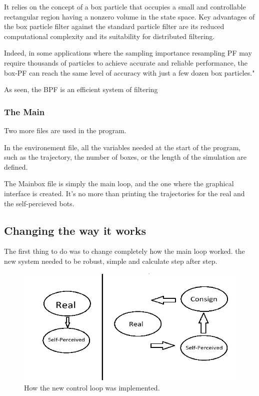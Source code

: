 It relies on the concept of a box particle that occupies a small and controllable rectangular region having a nonzero volume in the state space.
Key advantages of the box particle filter against the standard particle filter are its reduced computational complexity and its suitability for distributed filtering.

Indeed, in some applications where the sampling importance resampling PF may require thousands of particles to achieve accurate and reliable performance, the box-PF can reach the same level of accuracy with just a few dozen box particles."\parencite{BPF}

As seen, the BPF is an efficient system of filtering
\subsubsection{The Main}
Two more files are used in the program.

In the environement file, all the variables needed at the start of the program,
 such as the trajectory, the number of boxes, or the length of the simulation are defined.

The Mainbox file is simply the main loop, and the one where the graphical interface is created. It's no more than printing the trajectories for the real and the self-percieved bots.

\subsection{Changing the way it works}
The first thing to do was to change completely how the main loop worked.
the new system needed to be robust, simple and calculate step after step.

\begin{figure}[th]
\centering
\includegraphics{Figures/Loops}
\decoRule
\caption[the new loop]{How the new control loop was implemented.}
\label{fig:Loops}
\end{figure}

